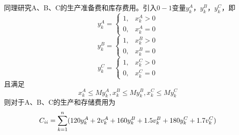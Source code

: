 同理研究A、B、C的生产准备费和库存费用。引入$0-1$变量$y_k^A$，$y_k^B$，$y_k^C$，即
\begin{equation}
    y_k^A=\begin{cases}
        1, & x_k^A>0\\
        0, & x_k^A=0
    \end{cases}
\end{equation}
\begin{equation}
    y_k^B=\begin{cases}
        1, & x_k^B>0\\
        0, & x_k^B=0
    \end{cases}
\end{equation}
\begin{equation}
    y_k^C=\begin{cases}
        1, & x_k^C>0\\
        0, & x_k^C=0
    \end{cases}
\end{equation}
且满足
\begin{equation}
    x_k^A \leq My_k^A,x_k^B \leq My_k^B,x_k^C \leq My_k^C
\end{equation}
则对于A、B、C的生产和存储费用为
\begin{equation}
    C_{\uppercase\expandafter{\romannumeral2}}=\sum_{k=1}^{n}(120y_k^A+2v_k^A+160y_k^B+1.5v_k^B+180y_k^C+1.7v_k^C)
\end{equation}


